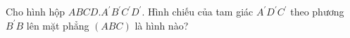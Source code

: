 \begin{ex}
Cho hình hộp $ABCD.A^{\prime}B^{\prime}C^{\prime}D^{\prime}$. Hình chiếu của tam giác $A^{\prime}D^{\prime}C^{\prime}$ theo phương $B^{\prime}B$ lên mặt phẳng $(ABC)$ là hình nào?
\end{ex}
